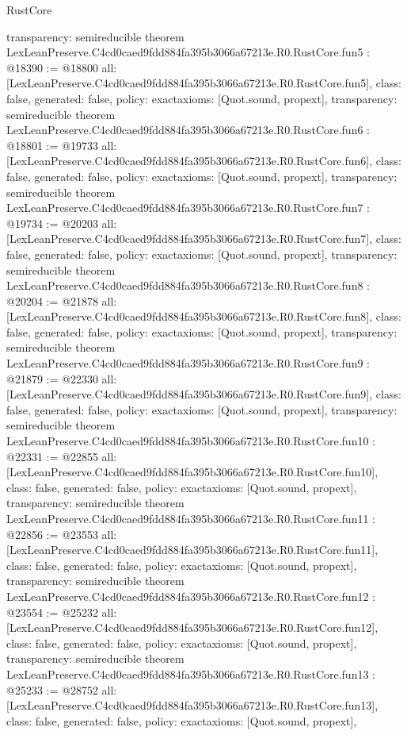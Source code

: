 \begin{lexlean}{RustCore}
\begin{coremodule}
{  transparency: semireducible
}
theorem LexLeanPreserve.C4cd0caed9fdd884fa395b3066a67213e.R0.RustCore.fun5 : @18390 := @18800 {
  all: [LexLeanPreserve.C4cd0caed9fdd884fa395b3066a67213e.R0.RustCore.fun5],
  class: false,
  generated: false,
  policy: exact{axioms: [Quot.sound, propext]},
  transparency: semireducible
}
theorem LexLeanPreserve.C4cd0caed9fdd884fa395b3066a67213e.R0.RustCore.fun6 : @18801 := @19733 {
  all: [LexLeanPreserve.C4cd0caed9fdd884fa395b3066a67213e.R0.RustCore.fun6],
  class: false,
  generated: false,
  policy: exact{axioms: [Quot.sound, propext]},
  transparency: semireducible
}
theorem LexLeanPreserve.C4cd0caed9fdd884fa395b3066a67213e.R0.RustCore.fun7 : @19734 := @20203 {
  all: [LexLeanPreserve.C4cd0caed9fdd884fa395b3066a67213e.R0.RustCore.fun7],
  class: false,
  generated: false,
  policy: exact{axioms: [Quot.sound, propext]},
  transparency: semireducible
}
theorem LexLeanPreserve.C4cd0caed9fdd884fa395b3066a67213e.R0.RustCore.fun8 : @20204 := @21878 {
  all: [LexLeanPreserve.C4cd0caed9fdd884fa395b3066a67213e.R0.RustCore.fun8],
  class: false,
  generated: false,
  policy: exact{axioms: [Quot.sound, propext]},
  transparency: semireducible
}
theorem LexLeanPreserve.C4cd0caed9fdd884fa395b3066a67213e.R0.RustCore.fun9 : @21879 := @22330 {
  all: [LexLeanPreserve.C4cd0caed9fdd884fa395b3066a67213e.R0.RustCore.fun9],
  class: false,
  generated: false,
  policy: exact{axioms: [Quot.sound, propext]},
  transparency: semireducible
}
theorem LexLeanPreserve.C4cd0caed9fdd884fa395b3066a67213e.R0.RustCore.fun10 : @22331 := @22855 {
  all: [LexLeanPreserve.C4cd0caed9fdd884fa395b3066a67213e.R0.RustCore.fun10],
  class: false,
  generated: false,
  policy: exact{axioms: [Quot.sound, propext]},
  transparency: semireducible
}
theorem LexLeanPreserve.C4cd0caed9fdd884fa395b3066a67213e.R0.RustCore.fun11 : @22856 := @23553 {
  all: [LexLeanPreserve.C4cd0caed9fdd884fa395b3066a67213e.R0.RustCore.fun11],
  class: false,
  generated: false,
  policy: exact{axioms: [Quot.sound, propext]},
  transparency: semireducible
}
theorem LexLeanPreserve.C4cd0caed9fdd884fa395b3066a67213e.R0.RustCore.fun12 : @23554 := @25232 {
  all: [LexLeanPreserve.C4cd0caed9fdd884fa395b3066a67213e.R0.RustCore.fun12],
  class: false,
  generated: false,
  policy: exact{axioms: [Quot.sound, propext]},
  transparency: semireducible
}
theorem LexLeanPreserve.C4cd0caed9fdd884fa395b3066a67213e.R0.RustCore.fun13 : @25233 := @28752 {
  all: [LexLeanPreserve.C4cd0caed9fdd884fa395b3066a67213e.R0.RustCore.fun13],
  class: false,
  generated: false,
  policy: exact{axioms: [Quot.sound, propext]},
}
\end{coremodule}
\end{lexlean}
